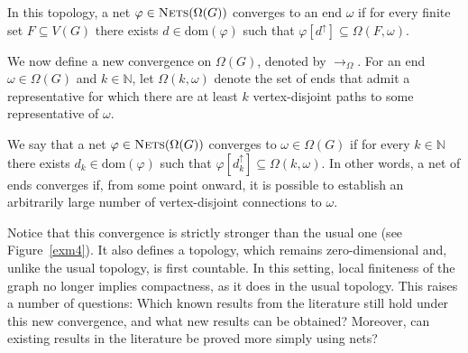 \documentclass{amsart}
\theoremstyle{definition}
\theoremstyle{remark}
\numberwithin{equation}{section}
\begin{document}
In this topology, a net $\varphi \in \textsc{Nets}(\Omega(G))$ converges to an end $\omega$ if for every finite set $F \subseteq V(G)$ there exists $d \in \mathrm{dom}(\varphi)$ such that $\varphi[d^\uparrow] \subseteq \Omega(F,\omega)$.

We now define a new convergence on $\Omega(G)$, denoted by $\to_\Omega$. For an end $\omega \in \Omega(G)$ and $k \in \mathbb{N}$, let $\Omega(k,\omega)$ denote the set of ends that admit a representative for which there are at least $k$ vertex-disjoint paths to some representative of $\omega$.

We say that a net $\varphi \in \textsc{Nets}(\Omega(G))$ converges to $\omega \in \Omega(G)$ if for every $k \in \mathbb{N}$ there exists $d_k \in \mathrm{dom}(\varphi)$ such that $\varphi[d_k^\uparrow] \subseteq \Omega(k,\omega)$. In other words, a net of ends converges if, from some point onward, it is possible to establish an arbitrarily large number of vertex-disjoint connections to $\omega$.

Notice that this convergence is strictly stronger than the usual one (see Figure~\ref{exm4}). It also defines a topology, which remains zero-dimensional and, unlike the usual topology, is first countable. In this setting, local finiteness of the graph no longer implies compactness, as it does in the usual topology. This raises a number of questions: Which known results from the literature still hold under this new convergence, and what new results can be obtained? Moreover, can existing results in the literature be proved more simply using nets?
\end{document}
